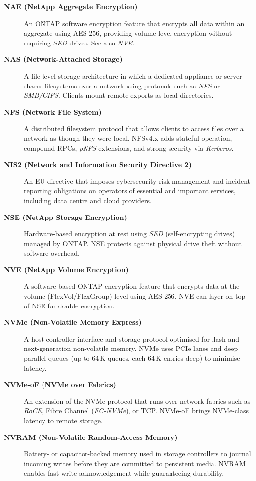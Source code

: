 \begin{description}

\item[\textbf{NAE (NetApp Aggregate Encryption)}]
An ONTAP software encryption feature that encrypts all data within an
aggregate using AES-256, providing volume-level encryption without
requiring \textit{SED} drives. See also \textit{NVE}.

\item[\textbf{NAS (Network-Attached Storage)}]
A file-level storage architecture in which a dedicated appliance or server
shares filesystems over a network using protocols such as \textit{NFS} or
\textit{SMB/CIFS}. Clients mount remote exports as local directories.

\item[\textbf{NFS (Network File System)}]
A distributed filesystem protocol that allows clients to access files over a
network as though they were local. NFSv4.x adds stateful operation,
compound RPCs, \textit{pNFS} extensions, and strong security via
\textit{Kerberos}.

\item[\textbf{NIS2 (Network and Information Security Directive 2)}]
An EU directive that imposes cybersecurity risk-management and
incident-reporting obligations on operators of essential and important
services, including data centre and cloud providers.

\item[\textbf{NSE (NetApp Storage Encryption)}]
Hardware-based encryption at rest using \textit{SED} (self-encrypting
drives) managed by ONTAP. NSE protects against physical drive theft without
software overhead.

\item[\textbf{NVE (NetApp Volume Encryption)}]
A software-based ONTAP encryption feature that encrypts data at the volume
(FlexVol/FlexGroup) level using AES-256. NVE can layer on top of NSE for
double encryption.

\item[\textbf{NVMe (Non-Volatile Memory Express)}]
A host controller interface and storage protocol optimised for flash and
next-generation non-volatile memory. NVMe uses PCIe lanes and deep
parallel queues (up to 64\,K queues, each 64\,K entries deep) to minimise
latency.

\item[\textbf{NVMe-oF (NVMe over Fabrics)}]
An extension of the NVMe protocol that runs over network fabrics such as
\textit{RoCE}, Fibre Channel (\textit{FC-NVMe}), or TCP. NVMe-oF brings
NVMe-class latency to remote storage.

\item[\textbf{NVRAM (Non-Volatile Random-Access Memory)}]
Battery- or capacitor-backed memory used in storage controllers to
journal incoming writes before they are committed to persistent media.
NVRAM enables fast write acknowledgement while guaranteeing durability.

\end{description}

